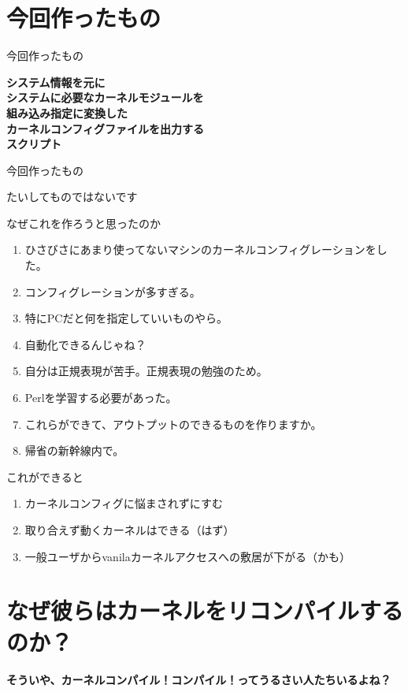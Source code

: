 \section{今回作ったもの}
\begin{frame}[containsverbatim]{今回作ったもの}
\begin{center}\bfseries
システム情報を元に\\
システムに必要なカーネルモジュールを\\
組み込み指定に変換した\\
カーネルコンフィグファイルを出力する\\
スクリプト
\end{center}
\end{frame}
\begin{frame}[containsverbatim]{今回作ったもの}
\begin{center}
たいしてものではないです
\end{center}
\end{frame}


\begin{frame}{なぜこれを作ろうと思ったのか}
\begin{enumerate}
\item ひさびさにあまり使ってないマシンのカーネルコンフィグレーションをした。
\item コンフィグレーションが多すぎる。
\item 特にPCだと何を指定していいものやら。
\item 自動化できるんじゃね？
\item 自分は正規表現が苦手。正規表現の勉強のため。
\item Perlを学習する必要があった。
\item これらができて、アウトプットのできるものを作りますか。
\item 帰省の新幹線内で。
\end{enumerate}
\end{frame}

\begin{frame}{これができると}
\begin{enumerate}
\item カーネルコンフィグに悩まされずにすむ
\item 取り合えず動くカーネルはできる（はず）
\item 一般ユーザからvanilaカーネルアクセスへの敷居が下がる（かも）
\end{enumerate}
\end{frame}

\section{なぜ彼らはカーネルをリコンパイルするのか？}
\begin{frame}[containsverbatim]{}
\begin{center}
\large\bfseries
そういや、カーネルコンパイル！コンパイル！ってうるさい人たちいるよね？
\end{center}
\end{frame}


